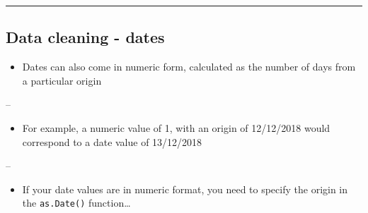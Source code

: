 \documentclass[]{article}
\newenvironment{Shaded}{\begin{snugshade}}{\end{snugshade}}
\newcommand{\DataTypeTok}[1]{\textcolor[rgb]{0.13,0.29,0.53}{#1}}
\newcommand{\KeywordTok}[1]{\textcolor[rgb]{0.13,0.29,0.53}{\textbf{#1}}}
\newcommand{\NormalTok}[1]{#1}
\newcommand{\OperatorTok}[1]{\textcolor[rgb]{0.81,0.36,0.00}{\textbf{#1}}}
\newcommand{\StringTok}[1]{\textcolor[rgb]{0.31,0.60,0.02}{#1}}
\providecommand{\tightlist}{%
  \setlength{\itemsep}{0pt}\setlength{\parskip}{0pt}}
\begin{document}
\begin{Shaded}
\end{Shaded}

\begin{Shaded}
\end{Shaded}

\begin{center}\rule{0.5\linewidth}{\linethickness}\end{center}

\hypertarget{data-cleaning---dates-1}{%
\subsection{Data cleaning - dates}\label{data-cleaning---dates-1}}

\begin{itemize}
\tightlist
\item
  Dates can also come in numeric form, calculated as the number of days
  from a particular origin
\end{itemize}

--

\begin{itemize}
\tightlist
\item
  For example, a numeric value of 1, with an origin of 12/12/2018 would
  correspond to a date value of 13/12/2018
\end{itemize}

--

\begin{itemize}
\tightlist
\item
  If your date values are in numeric format, you need to specify the
  origin in the \texttt{as.Date()} function\ldots{}
\end{itemize}
\end{document}
